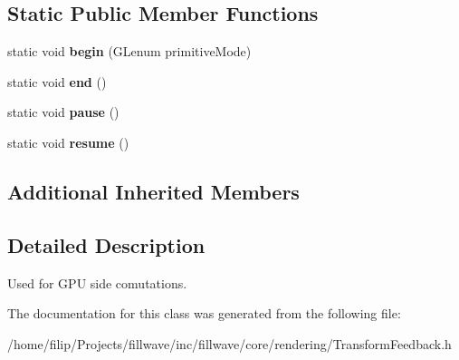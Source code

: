 \subsection*{Static Public Member Functions}
\begin{DoxyCompactItemize}
\item 
\hypertarget{classfillwave_1_1core_1_1TransformFeedback_ad4ee1c7c00faeda5dcf15e74c8a2386b}{}static void {\bfseries begin} (G\+Lenum primitive\+Mode)\label{classfillwave_1_1core_1_1TransformFeedback_ad4ee1c7c00faeda5dcf15e74c8a2386b}

\item 
\hypertarget{classfillwave_1_1core_1_1TransformFeedback_ae57ee1cebba97a38564092c82ec25afc}{}static void {\bfseries end} ()\label{classfillwave_1_1core_1_1TransformFeedback_ae57ee1cebba97a38564092c82ec25afc}

\item 
\hypertarget{classfillwave_1_1core_1_1TransformFeedback_a25aeffed0d608e950315db4b01ee74a2}{}static void {\bfseries pause} ()\label{classfillwave_1_1core_1_1TransformFeedback_a25aeffed0d608e950315db4b01ee74a2}

\item 
\hypertarget{classfillwave_1_1core_1_1TransformFeedback_ade6b06b3c31df11ff1dbbb4fbe16d164}{}static void {\bfseries resume} ()\label{classfillwave_1_1core_1_1TransformFeedback_ade6b06b3c31df11ff1dbbb4fbe16d164}

\end{DoxyCompactItemize}
\subsection*{Additional Inherited Members}


\subsection{Detailed Description}
Used for G\+P\+U side comutations. 

The documentation for this class was generated from the following file\+:\begin{DoxyCompactItemize}
\item 
/home/filip/\+Projects/fillwave/inc/fillwave/core/rendering/Transform\+Feedback.\+h\end{DoxyCompactItemize}
